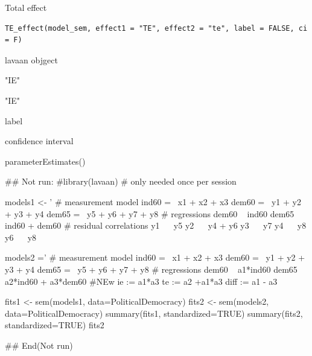 \documentclass[a4paper]{book}
\begin{document}
%
\begin{Description}
Total effect
\end{Description}
%
\begin{Usage}
\begin{verbatim}
TE_effect(model_sem, effect1 = "TE", effect2 = "te", label = FALSE, ci = F)
\end{verbatim}
\end{Usage}
%
\begin{Arguments}
\begin{ldescription}
\item[\code{model\_sem}] lavaan objgect

\item[\code{effect1}] "IE"

\item[\code{effect2}] "IE"

\item[\code{label}] label

\item[\code{ci}] confidence interval
\end{ldescription}
\end{Arguments}
%
\begin{Value}
parameterEstimates()
\end{Value}
%
\begin{Examples}
\begin{ExampleCode}

\#\# Not run: 
#library(lavaan) # only needed once per session

models1 <- '
  # measurement model
    ind60 =~ x1 + x2 + x3
    dem60 =~ y1 + y2 + y3 + y4
    dem65 =~ y5 + y6 + y7 + y8
    # regressions
    dem60 ~ ind60
    dem65 ~ ind60 + dem60
      # residual correlations
    y1 ~~ y5
    y2 ~~ y4 + y6
    y3 ~~ y7
    y4 ~~ y8
    y6 ~~ y8

models2 ='
  # measurement model
    ind60 =~ x1 + x2 + x3
    dem60 =~ y1 + y2 + y3 + y4
    dem65 =~ y5 + y6 + y7 + y8
     # regressions
    dem60 ~ a1*ind60
    dem65 ~ a2*ind60 + a3*dem60
 #NEw
   ie := a1*a3
   te := a2 +a1*a3
   diff := a1 - a3




fits1 <- sem(models1, data=PoliticalDemocracy)
fits2 <- sem(models2, data=PoliticalDemocracy)
summary(fits1, standardized=TRUE)
summary(fits2, standardized=TRUE)
fits2 %

## End(Not run)

\end{ExampleCode}
\end{Examples}
\end{document}
